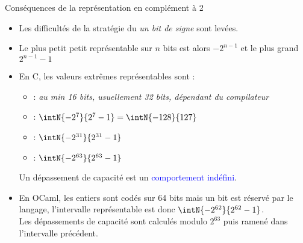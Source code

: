 \documentclass[10pt]{beamer}
\begin{document}
\begin{frame}{\Ctitle}{\stitle}
    \begin{block}{Conséquences de la représentation en complément à 2}
        \begin{itemize}
            \item<1-> Les difficultés de la stratégie du \textit{un bit de signe} sont levées.
            \item<2-> Le plus petit petit représentable sur $n$ bits est alors $-2^{n-1}$ et le plus grand $2^{n-1}-1$
            \item<3-> En C, les valeurs extrêmes représentables sont :
            \begin{itemize}
            \item<4->  : \textit{au min 16 bits, usuellement 32 bits, dépendant du compilateur}
            \item<5->  : $\intN{-2^7}{2^7-1} = \intN{-128}{127}$
            \item<6->   : $\intN{-2^{31}}{2^{31}-1}$ 
            \item<7->   : $\intN{-2^{63}}{2^{63}-1}$ 
            \end{itemize}
             \textcolor{red}{\danger} Un dépassement de capacité est un \textcolor{blue}{comportement indéfini}.
            \item<9-> En OCaml, les entiers sont codés sur 64 bits mais un bit est réservé par le langage, l'intervalle représentable est donc $\intN{-2^{62}}{2^{62}-1}$.\\ 
             Les dépassements de capacité sont calculés modulo  $2^{63}$ puis ramené dans l'intervalle précédent.
        \end{itemize}
    \end{block}
\end{frame}
\end{document}
